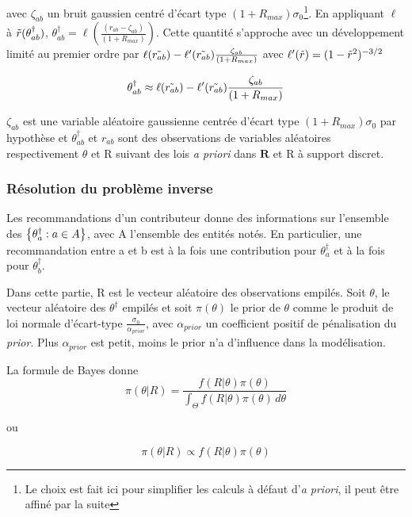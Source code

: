 avec $\zeta_{ab}$ un bruit gaussien centré d'écart type $(1+R_{max})\sigma_0$\footnote{Le choix est fait ici pour simplifier les calculs à défaut d'\textit{a priori}, il peut être affiné par la suite}.
En appliquant $\ell$ à $\Tilde{r}(\theta_{ab}^\dagger)$, $\theta_{ab}^\dagger = \ell (\frac{( r_{ab}-\zeta_{ab})}{(1+R_{max})})$.
Cette quantité s'approche avec un développement limité au premier ordre par $\ell(\Tilde{r_{ab}}) - \ell'(\Tilde{r_{ab}})\frac{\zeta_{ab}}{(1+R_{max})}$ avec $\ell'(\Tilde{r})=(1-\Tilde{r}^2)^{-3/2}$

\begin{equation}
    \theta_{ab}^\dagger \approx \ell(\Tilde{r_{ab}}) - \ell'(\Tilde{r_{ab}})\frac{\zeta_{ab}}{(1+R_{max})}
\end{equation}

$\zeta_{ab}$ est une variable aléatoire gaussienne centrée d'écart type $(1+R_{max})\sigma_0$  par hypothèse
et $\theta_{ab}^\dagger$ et $r_{ab}$ sont des observations de variables aléatoires respectivement $\theta$ et R suivant des lois \textit{a priori} dans $\mathbf{R}$ et R à support discret.

\subsubsection{Résolution du problème inverse}

Les recommandations d'un contributeur donne des informations sur l'ensemble des $\left\lbrace \theta^\dagger_a : a \in A \right\rbrace$, avec A l'ensemble des entités notés.
En particulier, une recommandation entre a et b est à la fois une contribution pour $\theta^\dagger_a$ et à la fois pour $\theta^\dagger_b$.

Dans cette partie, R est le vecteur aléatoire des observations empilés.
Soit $\theta$, le vecteur aléatoire des $\theta^\dagger$ empilés
et soit $\pi(\theta)$ le prior de $\theta$ comme le produit de loi normale d'écart-type $\frac{\sigma_0}{\alpha_{prior}}$, avec $\alpha_{prior}$ un coefficient positif de pénalisation du \textit{prior}. Plus $\alpha_{prior}$ est petit, moins le prior n'a d'influence dans la modélisation.

La formule de Bayes donne  
\begin{equation}
\pi(\theta|R) = \frac{f(R|\theta)\pi(\theta)}
{\int_{\Theta} f(R|\theta)\pi(\theta) \,d\theta }
\end{equation}

ou  

\begin{equation}
\pi(\theta|R) \propto f(R|\theta)\pi(\theta)
\end{equation}

